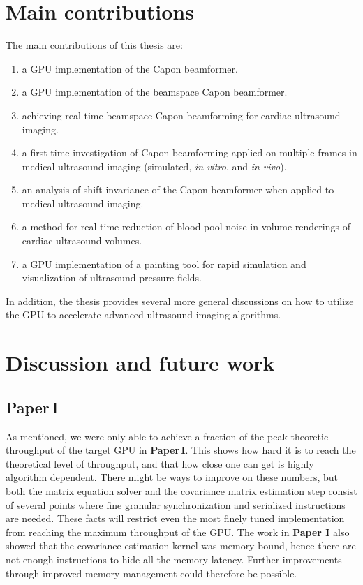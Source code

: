 \section{Main contributions}
The main contributions of this thesis are:
\begin{enumerate}
\item a GPU implementation of the Capon beamformer.
\item a GPU implementation of the beamspace Capon beamformer.
\item achieving real-time beamspace Capon beamforming for cardiac ultrasound imaging.
\item a first-time investigation of Capon beamforming applied on multiple frames in medical ultrasound imaging (simulated, \textit{in vitro}, and \textit{in vivo}).
\item an analysis of shift-invariance of the Capon beamformer when applied to medical ultrasound imaging.
\item a method for real-time reduction of blood-pool noise in volume renderings of cardiac ultrasound volumes.
\item a GPU implementation of a painting tool for rapid simulation and visualization of ultrasound pressure fields.
\end{enumerate}
In addition, the thesis provides several more general discussions on how to utilize the GPU to accelerate advanced ultrasound imaging algorithms. 

\section{Discussion and future work}
\subsection{Paper\,I}
As mentioned, we were only able to achieve a fraction of the peak theoretic throughput of the target GPU in \textbf{Paper\,I}. This shows how hard it is to reach the theoretical level of throughput, and that how close one can get is highly algorithm dependent. There might be ways to improve on these numbers, but both the matrix equation solver and the covariance matrix estimation step consist of several points where fine granular synchronization and serialized instructions are needed. These facts will restrict even the most finely tuned implementation from reaching the maximum throughput of the GPU. The work in \textbf{Paper I} also showed that the covariance estimation kernel was memory bound, hence there are not enough instructions to hide all the memory latency. Further improvements through improved memory management could therefore be possible. 

